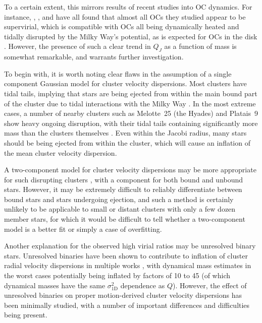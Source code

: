 To a certain extent, this mirrors results of recent studies into OC dynamics. For instance, \cite{bravi_gaia-eso_2018}, \cite{kuhn_kinematics_2019}, and \cite{pang_3d_2021} have all found that almost all OCs they studied appear to be supervirial, which is compatible with OCs all being dynamically heated and tidally disrupted by the Milky Way's potential, as is expected for OCs in the disk \citep{krause_physics_2020}. However, the presence of such a clear trend in $Q_J$ as a function of mass is somewhat remarkable, and warrants further investigation.

To begin with, it is worth noting clear flaws in the assumption of a single component Gaussian model for cluster velocity dispersions. Most clusters have tidal tails, implying that stars are being ejected from within the main bound part of the cluster due to tidal interactions with the Milky Way \citep{meingast_extended_2021,tarricq_structural_2022}. In the most extreme cases, a number of nearby clusters such as Melotte~25 (the Hyades) and Platais~9 show heavy ongoing disruption, with their tidal tails containing significantly more mass than the clusters themselves \citep{oh_kinematic_modelling_2020,meingast_extended_2021}. Even within the Jacobi radius, many stars should be being ejected from within the cluster, which will cause an inflation of the mean cluster velocity dispersion. 

A two-component model for cluster velocity dispersions may be more appropriate for such disrupting clusters \citep[see e.g.][]{kuhn_kinematics_2019}, with a component for both bound and unbound stars. However, it may be extremely difficult to reliably differentiate between bound stars and stars undergoing ejection, and such a method is certainly unlikely to be applicable to small or distant clusters with only a few dozen member stars, for which it would be difficult to tell whether a two-component model is a better fit or simply a case of overfitting.

Another explanation for the observed high virial ratios may be unresolved binary stars. Unresolved binaries have been shown to contribute to inflation of cluster radial velocity dispersions in multiple works \citep[e.g.][]{gieles_velocity_2010,rastello_effect_binarity_2020}, with dynamical mass estimates in the worst cases potentially being inflated by factors of 10 to 45 (of which dynamical masses have the same $\sigma_\text{1D}^2$ dependence as $Q$). However, the effect of unresolved binaries on proper motion-derived cluster velocity dispersions has been minimally studied, with a number of important differences and difficulties being present.


